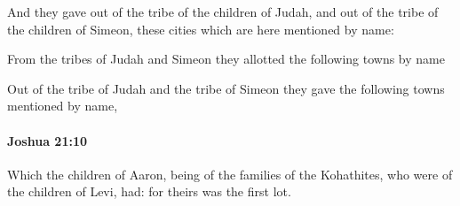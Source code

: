 			\begin{versebox}
					\item[BHS] 
					\item[ASV] And they gave out of the tribe of the children of Judah, and out of the tribe of the children of Simeon, these cities which are here mentioned by name:
					\item[NIV] From the tribes of Judah and Simeon they allotted the following towns by name
					\item[NRSV] Out of the tribe of Judah and the tribe of Simeon they gave the following towns mentioned by name,
			\end{versebox}

		\paragraph{Joshua 21:10} %
			\label{JOSHUA-21-10}

			Which the children of Aaron, being of the families of the Kohathites, who were of the children of Levi, had: for theirs was the first lot.

